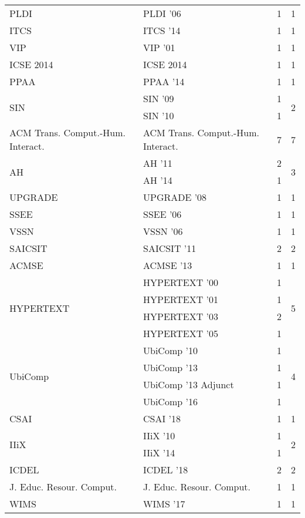 \begin{table*}[t]
\begin{tabular}{llrr}
\multirow{1}{*}{PLDI } & PLDI '06 & 1 & \multirow{1}{*}{1}\\
\multirow{1}{*}{ITCS } & ITCS '14 & 1 & \multirow{1}{*}{1}\\
\multirow{1}{*}{VIP } & VIP '01 & 1 & \multirow{1}{*}{1}\\
\multirow{1}{*}{ICSE 2014} & ICSE 2014 & 1 & \multirow{1}{*}{1}\\
\multirow{1}{*}{PPAA } & PPAA '14 & 1 & \multirow{1}{*}{1}\\
\multirow{2}{*}{SIN } & SIN '09 & 1 & \multirow{2}{*}{2}\\
& SIN '10 & 1 &\\
\multirow{1}{*}{ACM Trans. Comput.-Hum. Interact.} & ACM Trans. Comput.-Hum. Interact. & 7 & \multirow{1}{*}{7}\\
\multirow{2}{*}{AH } & AH '11 & 2 & \multirow{2}{*}{3}\\
& AH '14 & 1 &\\
\multirow{1}{*}{UPGRADE } & UPGRADE '08 & 1 & \multirow{1}{*}{1}\\
\multirow{1}{*}{SSEE } & SSEE '06 & 1 & \multirow{1}{*}{1}\\
\multirow{1}{*}{VSSN } & VSSN '06 & 1 & \multirow{1}{*}{1}\\
\multirow{1}{*}{SAICSIT } & SAICSIT '11 & 2 & \multirow{1}{*}{2}\\
\multirow{1}{*}{ACMSE } & ACMSE '13 & 1 & \multirow{1}{*}{1}\\
\multirow{4}{*}{HYPERTEXT } & HYPERTEXT '00 & 1 & \multirow{4}{*}{5}\\
& HYPERTEXT '01 & 1 &\\
& HYPERTEXT '03 & 2 &\\
& HYPERTEXT '05 & 1 &\\
\multirow{4}{*}{UbiComp } & UbiComp '10 & 1 & \multirow{4}{*}{4}\\
& UbiComp '13 & 1 &\\
& UbiComp '13 Adjunct & 1 &\\
& UbiComp '16 & 1 &\\
\multirow{1}{*}{CSAI } & CSAI '18 & 1 & \multirow{1}{*}{1}\\
\multirow{2}{*}{IIiX } & IIiX '10 & 1 & \multirow{2}{*}{2}\\
& IIiX '14 & 1 &\\
\multirow{1}{*}{ICDEL } & ICDEL '18 & 2 & \multirow{1}{*}{2}\\
\multirow{1}{*}{J. Educ. Resour. Comput.} & J. Educ. Resour. Comput. & 1 & \multirow{1}{*}{1}\\
\multirow{1}{*}{WIMS } & WIMS '17 & 1 & \multirow{1}{*}{1}\\

\end{tabular}
\end{table*}

